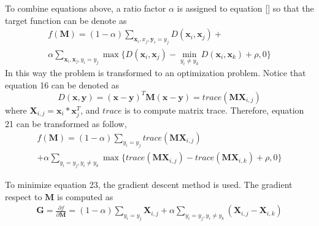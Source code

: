  To combine equations above, a ratio factor $\alpha$ is assigned to equation [] so that the target function can be denote as 
  \begin{equation}
  \begin{aligned}
 f(\bm{M}) = (1-\alpha)\sum_{\bm{x}_i,x_j,\bm{y}_i=y_j} D(\bm{x}_i,\bm{x}_j) + \\
  \alpha \sum_{\bm{x}_i,\bm{x}_j,y_i=y_j}\max\{{D(\bm{x}_i,\bm{x}_j)-\min_{y_i\ne y_k}{D(\bm{x}_i,\bm{x}_k)}+\rho,0}\}
 \end{aligned}
 \end{equation}
 In this way the problem is transformed to an optimization problem. Notice that equation 16 can be denoted as 
 \begin{equation}
 D(\bm{x},\bm{y}) = (\bm{x} - \bm{y})^T\bm{M}(\bm{x} - \bm{y}) = trace(\bm{M}\bm{X}_{i,j})
 \end{equation}
 where $\bm{X}_{i,j} = \bm{x}_i*\bm{x}_j^T$, and $trace$ is to compute matrix trace. Therefore, equation 21 can be transformed as follow,
 \begin{equation}
 \begin{aligned}
 f(\bm{M}) = (1-\alpha)\sum_{y_i = y_j}trace(\bm{M}\bm{X}_{i,j}) \\
  + \alpha \sum_{y_i = y_j,y_i\ne y_k}\max\{trace(\bm{M}\bm{X}_{i,j}) - trace(\bm{M}\bm{X}_{i,k} )+ \rho,0\}
 \end{aligned}
 \end{equation}
 
 To minimize equation 23, the gradient descent method is used. The gradient respect to $\bm{M}$ is computed as
 \begin{equation}
 \begin{aligned}
\bm{G} =  \frac{\partial f}{\partial \bm{M}} = (1-\alpha) \sum_{y_i = y_j} \bm{X}_{i,j} 
 + \alpha \sum_{y_i = y_j, y_i \ne y_k}(\bm{X}_{i,j} - \bm{X}_{i,k})
 \end{aligned}
 \end{equation}
 
